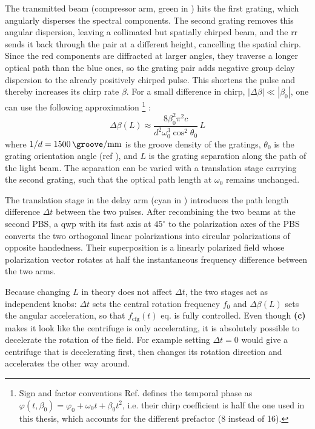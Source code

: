 The transmitted beam (compressor arm, green in ) hits the first grating, which angularly disperses the spectral components. The second grating removes this angular dispersion, leaving a collimated but spatially chirped beam, and the \gls{rr} sends it back through the pair at a different height, cancelling the spatial chirp. Since the red components are diffracted at larger angles, they traverse a longer optical path than the blue ones, so the grating pair adds negative group delay dispersion to the already positively chirped pulse. This shortens the pulse and thereby increases its chirp rate $\beta$. For a small difference in chirp, $|\Delta\beta| \ll |\beta_0|$, one can use the following approximation \footnote{Sign and factor conventions Ref. \cite{wangUltraslowOpticalCentrifuge2026} defines the temporal phase as $\varphi(t,\beta_0) = \varphi_0 + \omega_0 t + \beta_0 t^2$, i.e. their chirp coefficient is half the one used in this thesis, which accounts for the different prefactor (8 instead of 16).} \cite{wangUltraslowOpticalCentrifuge2026}:
\begin{equation}
     \Delta\beta(L) \approx \frac{8\beta_0^2\pi^2 c}{d^2\omega_0^3\cos^2\theta_0}\,L 
\end{equation}
where $1/d = \SI{1500}{\groove\per\milli\meter}$ is the groove density of the gratings, $\theta_0$ is the grating orientation angle (ref ), and $L$ is the grating separation along the path of the light beam. The separation can be varied with a translation stage carrying the second grating, such that the optical path length at $\omega_0$ remains unchanged.

The translation stage in the delay arm (cyan in ) introduces the path length difference $\Delta t$ between the two pulses. After recombining the two beams at the second PBS, a \gls{qwp} with its fast axis at $45^\circ$ to the polarization axes of the PBS converts the two orthogonal linear polarizations into circular polarizations of opposite handedness. Their superposition is a linearly polarized field whose polarization vector rotates at half the instantaneous frequency difference between the two arms.

Because changing $L$ in theory does not affect $\Delta t$, the two stages act as independent knobs: $\Delta t$ sets the central rotation frequency $f_0$ and $\Delta\beta(L)$ sets the angular acceleration, so that $f_{\mathrm{cfg}}(t)$ eq.  is fully controlled. Even though  \textbf{(c)} makes it look like the centrifuge is only accelerating, it is absolutely possible to decelerate the rotation of the field. For example setting $\Delta t = 0$ would give a centrifuge that is decelerating first, then changes its rotation direction and accelerates the other way around.

